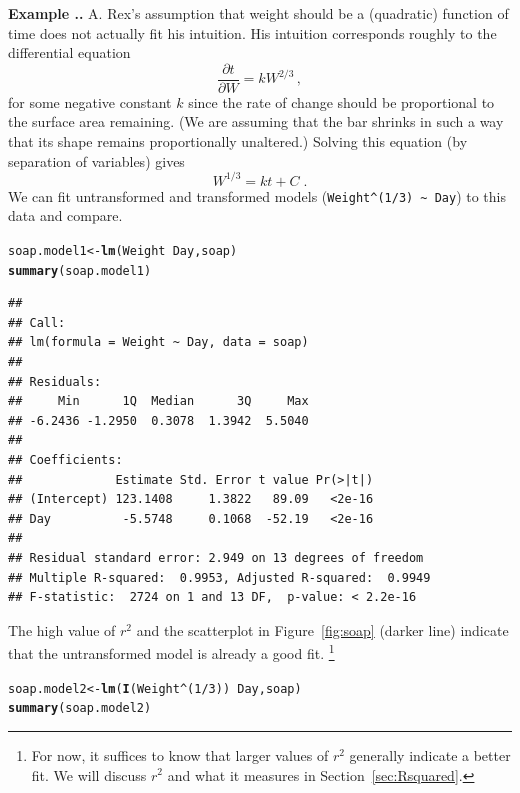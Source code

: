 \documentclass[twoside]{book}\usepackage[]{graphicx}\usepackage[]{xcolor}
\makeatletter
\newcommand{\hlnum}[1]{\textcolor[rgb]{0.686,0.059,0.569}{#1}}%
\newcommand{\hlopt}[1]{\textcolor[rgb]{0,0,0}{#1}}%
\newcommand{\hlstd}[1]{\textcolor[rgb]{0.345,0.345,0.345}{#1}}%
\newcommand{\hlkwb}[1]{\textcolor[rgb]{0.69,0.353,0.396}{#1}}%
\newcommand{\hlkwd}[1]{\textcolor[rgb]{0.737,0.353,0.396}{\textbf{#1}}}%
\newenvironment{kframe}{%
 \def\at@end@of@kframe{}%
 \ifinner\ifhmode%
  \def\at@end@of@kframe{\end{minipage}}%
  \begin{minipage}{\columnwidth}%
 \fi\fi%
 \def\FrameCommand##1{\hskip\@totalleftmargin \hskip-\fboxsep
 \colorbox{shadecolor}{##1}\hskip-\fboxsep
     \hskip-\linewidth \hskip-\@totalleftmargin \hskip\columnwidth}%
 \MakeFramed {\advance\hsize-\width
   \@totalleftmargin\z@ \linewidth\hsize
   \@setminipage}}%
 {\par\unskip\endMakeFramed%
 \at@end@of@kframe}
\newenvironment{knitrout}{}{} %
\newcommand{\Partial}[2]{\frac{\partial #1}{\partial #2}}
\def\answer{{\sf A. }}
\newcounter{example}[section]
\newenvironment{example}%
{\refstepcounter{example}%
\textbf{Example \thesection.\arabic{example}. }}%
{}
\makeatother
\begin{document}
\begin{example}
\answer
Rex's assumption that weight should be a (quadratic) function of time 
does not actually fit his intuition.  His intuition corresponds roughly to the 
differential equation
\[
\Partial{t}{W} = k W^{2/3}\,,
\]
for some negative constant $k$ since the rate of change should be 
proportional to the surface area remaining.  
(We are assuming that the bar shrinks in such a way 
that its shape remains proportionally unaltered.)
Solving this equation (by separation of variables) gives
\[
W^{1/3} = k t + C
\;.
\]
We can fit untransformed and transformed models 
(\verb!Weight^(1/3) ~ Day!) to this data and compare.
\begin{knitrout}
\color{fgcolor}\begin{kframe}
\begin{alltt}
\hlstd{soap.model1} \hlkwb{<-} \hlkwd{lm}\hlstd{(Weight} \hlopt{~} \hlstd{Day, soap)}
\hlkwd{summary}\hlstd{(soap.model1)}
\end{alltt}
\begin{verbatim}
## 
## Call:
## lm(formula = Weight ~ Day, data = soap)
## 
## Residuals:
##     Min      1Q  Median      3Q     Max 
## -6.2436 -1.2950  0.3078  1.3942  5.5040 
## 
## Coefficients:
##             Estimate Std. Error t value Pr(>|t|)
## (Intercept) 123.1408     1.3822   89.09   <2e-16
## Day          -5.5748     0.1068  -52.19   <2e-16
## 
## Residual standard error: 2.949 on 13 degrees of freedom
## Multiple R-squared:  0.9953,	Adjusted R-squared:  0.9949 
## F-statistic:  2724 on 1 and 13 DF,  p-value: < 2.2e-16
\end{verbatim}
\end{kframe}
\end{knitrout}
The high value of $r^2$ and the scatterplot in Figure~\ref{fig:soap} 
(darker line) indicate that the untransformed model is already a good fit.%
\footnote{
For now, it suffices
to know that larger values of $r^2$ generally indicate a better fit.
We will discuss $r^2$ and what it measures in Section~\ref{sec:Rsquared}.
}
\begin{knitrout}
\color{fgcolor}\begin{kframe}
\begin{alltt}
\hlstd{soap.model2} \hlkwb{<-} \hlkwd{lm}\hlstd{(}\hlkwd{I}\hlstd{(Weight}\hlopt{^}\hlstd{(}\hlnum{1}\hlopt{/}\hlnum{3}\hlstd{))} \hlopt{~} \hlstd{Day, soap)}
\hlkwd{summary}\hlstd{(soap.model2)}
\end{alltt}

\end{kframe}
\end{knitrout}
\end{example}
\end{document}
